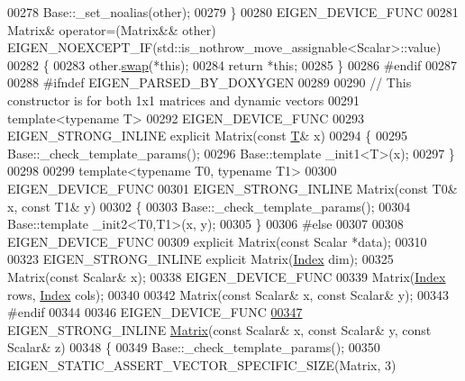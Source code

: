 \begin{DoxyCode}
00278         Base::\_set\_noalias(other);
00279     \}
00280     EIGEN\_DEVICE\_FUNC
00281     Matrix& operator=(Matrix&& other) EIGEN\_NOEXCEPT\_IF(std::is\_nothrow\_move\_assignable<Scalar>::value)
00282     \{
00283       other.\hyperlink{group___core___module_ab420d9d588ac443f5a1b1a7dceb12c90}{swap}(*\textcolor{keyword}{this});
00284       \textcolor{keywordflow}{return} *\textcolor{keyword}{this};
00285     \}
00286 \textcolor{preprocessor}{#endif}
00287 
00288 \textcolor{preprocessor}{    #ifndef EIGEN\_PARSED\_BY\_DOXYGEN}
00289 
00290     \textcolor{comment}{// This constructor is for both 1x1 matrices and dynamic vectors}
00291     \textcolor{keyword}{template}<\textcolor{keyword}{typename} T>
00292     EIGEN\_DEVICE\_FUNC
00293     EIGEN\_STRONG\_INLINE \textcolor{keyword}{explicit} Matrix(\textcolor{keyword}{const} \hyperlink{group___sparse_core___module}{T}& x)
00294     \{
00295       Base::\_check\_template\_params();
00296       Base::template \_init1<T>(x);
00297     \}
00298 
00299     \textcolor{keyword}{template}<\textcolor{keyword}{typename} T0, \textcolor{keyword}{typename} T1>
00300     EIGEN\_DEVICE\_FUNC
00301     EIGEN\_STRONG\_INLINE Matrix(\textcolor{keyword}{const} T0& x, \textcolor{keyword}{const} T1& y)
00302     \{
00303       Base::\_check\_template\_params();
00304       Base::template \_init2<T0,T1>(x, y);
00305     \}
00306 \textcolor{preprocessor}{    #else}
00307 
00308     EIGEN\_DEVICE\_FUNC
00309     \textcolor{keyword}{explicit} Matrix(\textcolor{keyword}{const} Scalar *data);
00310 
00323     EIGEN\_STRONG\_INLINE \textcolor{keyword}{explicit} Matrix(\hyperlink{namespace_eigen_a62e77e0933482dafde8fe197d9a2cfde}{Index} dim);
00325     Matrix(\textcolor{keyword}{const} Scalar& x);
00338     EIGEN\_DEVICE\_FUNC
00339     Matrix(\hyperlink{namespace_eigen_a62e77e0933482dafde8fe197d9a2cfde}{Index} rows, \hyperlink{namespace_eigen_a62e77e0933482dafde8fe197d9a2cfde}{Index} cols);
00340     
00342     Matrix(\textcolor{keyword}{const} Scalar& x, \textcolor{keyword}{const} Scalar& y);
00343 \textcolor{preprocessor}{    #endif}
00344 
00346     EIGEN\_DEVICE\_FUNC
\hyperlink{group___core___module_a0a422e4c801e859d47226c348c482cb5}{00347}     EIGEN\_STRONG\_INLINE \hyperlink{group___core___module_a0a422e4c801e859d47226c348c482cb5}{Matrix}(\textcolor{keyword}{const} Scalar& x, \textcolor{keyword}{const} Scalar& y, \textcolor{keyword}{const} Scalar& z)
00348     \{
00349       Base::\_check\_template\_params();
00350       EIGEN\_STATIC\_ASSERT\_VECTOR\_SPECIFIC\_SIZE(Matrix, 3)

\end{DoxyCode}
